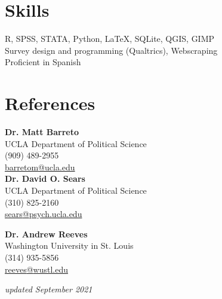 \documentclass[11pt, a4paper]{article}
\begin{document}
\section*{Skills}

R, SPSS, STATA, Python, \LaTeX, SQLite, QGIS, GIMP\\
Survey design and programming (Qualtrics), Webscraping\\
Proficient in Spanish\\

\section*{References}

\begin{multicols}{2}
\textbf{Dr. Matt Barreto}\\
UCLA Department of Political Science \\
(909) 489-2955\\
\href{mailto:barretom@ucla.edu}{barretom\textrm{@}ucla.edu}\\

\textbf{Dr. David O. Sears}\\
UCLA Department of Political Science \\
(310) 825-2160\\
\href{mailto:sears@psych.ucla.edu}{sears\textrm{@}psych.ucla.edu}\\

\columnbreak

\textbf{Dr. Andrew Reeves}\\
Washington University in St. Louis \\
(314) 935-5856\\
\href{mailto:reeves@wustl.edu}{reeves\textrm{@}wustl.edu}\\
\end{multicols}






\textit{updated September 2021}
\end{document}
